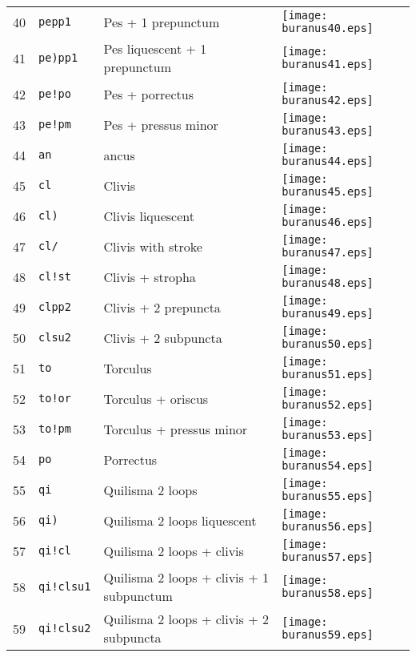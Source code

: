 \documentclass{scrarticle}
\begin{document}
\begin{longtable}{l|l|l|l}
40 & \texttt{pepp1} & Pes + 1 prepunctum & \texttt{[image: buranus40.eps]} \\
41 & \texttt{pe)pp1} & Pes liquescent + 1 prepunctum & \texttt{[image: buranus41.eps]} \\
42 & \texttt{pe!po} & Pes + porrectus & \texttt{[image: buranus42.eps]} \\
43 & \texttt{pe!pm} & Pes + pressus minor & \texttt{[image: buranus43.eps]} \\
44 & \texttt{an} & ancus & \texttt{[image: buranus44.eps]} \\
45 & \texttt{cl} & Clivis & \texttt{[image: buranus45.eps]} \\
46 & \texttt{cl)} & Clivis liquescent & \texttt{[image: buranus46.eps]} \\
47 & \texttt{cl/} & Clivis with stroke & \texttt{[image: buranus47.eps]} \\
48 & \texttt{cl!st} & Clivis + stropha & \texttt{[image: buranus48.eps]} \\
49 & \texttt{clpp2} & Clivis + 2 prepuncta & \texttt{[image: buranus49.eps]} \\
50 & \texttt{clsu2} & Clivis + 2 subpuncta & \texttt{[image: buranus50.eps]} \\
51 & \texttt{to} & Torculus & \texttt{[image: buranus51.eps]} \\
52 & \texttt{to!or} & Torculus + oriscus & \texttt{[image: buranus52.eps]} \\
53 & \texttt{to!pm} & Torculus + pressus minor & \texttt{[image: buranus53.eps]} \\
54 & \texttt{po} & Porrectus & \texttt{[image: buranus54.eps]} \\
55 & \texttt{qi} & Quilisma 2 loops & \texttt{[image: buranus55.eps]} \\
56 & \texttt{qi)} & Quilisma 2 loops liquescent & \texttt{[image: buranus56.eps]} \\
57 & \texttt{qi!cl} & Quilisma 2 loops + clivis & \texttt{[image: buranus57.eps]} \\
58 & \texttt{qi!clsu1} & Quilisma 2 loops + clivis + 1 subpunctum & \texttt{[image: buranus58.eps]} \\
59 & \texttt{qi!clsu2} & Quilisma 2 loops + clivis + 2 subpuncta & \texttt{[image: buranus59.eps]} \\

\end{longtable}
\end{document}
